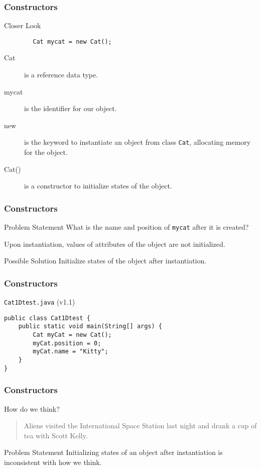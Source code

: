 \documentclass[10pt, compress]{beamer}
\begin{document}
\begin{frame}[fragile]
	\frametitle{Constructors}
	\begin{block}{Closer Look}
		\begin{verbatim}
		Cat mycat = new Cat();
		\end{verbatim}
		\begin{description}
		\item[Cat] is a reference data type.
		\item[mycat] is the identifier for our object.
		\item[new] is the keyword to instantiate an object from class \texttt{Cat}, allocating memory for the object.
		\item[Cat()] is a constructor to initialize states of the object.
		\end{description}
	\end{block}
\end{frame}

\begin{frame}[fragile]
	\frametitle{Constructors}
	\begin{block}{Problem Statement}
		What is the name and position of \texttt{mycat} after it is created?

		Upon instantiation, values of attributes of the object are not initialized.
	\end{block}
	\begin{block}{Possible Solution}
		Initialize states of the object after instantiation.
	\end{block}
\end{frame}

\begin{frame}[fragile]
	\frametitle{Constructors}
	\begin{block}{\texttt{Cat1Dtest.java} (v1.1)}
		\begin{verbatim}
public class Cat1Dtest {
	public static void main(String[] args) {
		Cat myCat = new Cat();
		myCat.position = 0;
		myCat.name = "Kitty";
	}
}
		\end{verbatim}
	\end{block}
\end{frame}

\begin{frame}[fragile]
	\frametitle{Constructors}
	\begin{block}{How do we think?}
		\begin{quote}
		Aliens visited the International Space Station last night and drank a cup of tea with Scott Kelly.
		\end{quote}
	\end{block}
	\begin{block}{Problem Statement}
		Initializing states of an object after instantiation is inconsistent with how we think.
	\end{block}
\end{frame}
\end{document}
